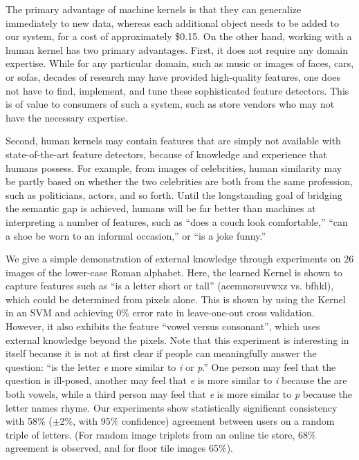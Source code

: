 \documentclass{article}
\begin{document}
The primary advantage of machine kernels is that they can generalize immediately to new data, whereas each additional object needs to be added to our system, for a cost of approximately \$0.15.  On the other hand, working with a human kernel has two primary advantages.  First, it does not require any domain expertise.  While for any particular domain, such as music or images of faces, cars, or sofas, decades of research may have provided high-quality features, one does not have to find, implement, and tune these sophisticated feature detectors.  This is of value to consumers of such a system, such as store vendors who may not have the necessary expertise.

Second, human kernels may contain features that are simply not available with state-of-the-art feature detectors, because of knowledge and experience that humans possess.  For example, from images of celebrities, human similarity may be partly based on whether the two celebrities are both from the same profession, such as politicians, actors, and so forth.  Until the longstanding goal of bridging the semantic gap is achieved, humans will be far better than machines at interpreting a number of features, such as ``does a couch look comfortable,'' ``can a shoe be worn to an informal occasion,'' or ``is a joke funny.''

We give a simple demonstration of external knowledge through
experiments on 26 images of the lower-case Roman alphabet.  Here, the
learned Kernel is shown to capture features such as ``is a letter
short or tall'' (acemnorsuvwxz vs. bfhkl), which could be determined
from pixels alone. This is shown by using the Kernel in an SVM and
achieving 0\% error rate in leave-one-out cross validation.  However,
it also exhibits the feature ``vowel versus consonant'', which uses
external knowledge beyond the pixels.  Note that this experiment is
interesting in itself because it is not at first clear if people can
meaningfully answer the question: ``is the letter {\em e} more similar
to {\em i} or {\em p}.'' One person may feel that the question is
ill-posed, another may feel that {\em e} is more similar to {\em i}
because the are both vowels, while a third person may feel that {\em
  e} is more similar to {\em p} because the letter names rhyme.  Our
experiments show statistically significant consistency with 58\%
($\pm$2\%, with 95\% confidence) agreement between users on a random
triple of letters.  (For random image triplets from an online tie
store, 68\% agreement is observed, and for floor tile images 65\%).
\end{document}
